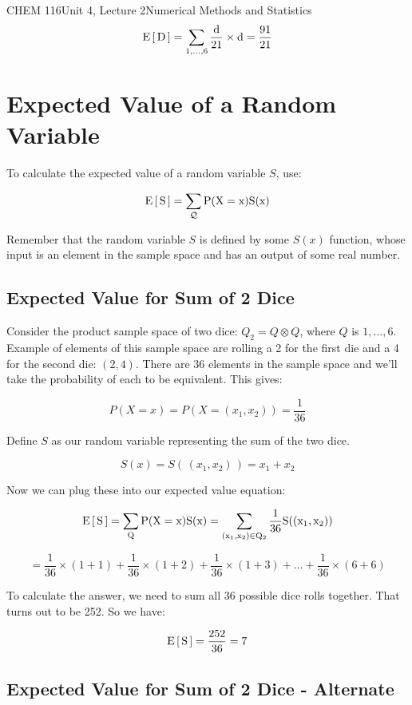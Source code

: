 \documentclass{article}
\begin{document}
\begin{tdoc}{CHEM 116}{Unit 4, Lecture 2}{Numerical Methods and Statistics}
\[
\rm{E}\left[\,D\,\right] = \sum_{1,\ldots,6} \frac{d}{21} \times d = \frac{91}{21}
\]

\section{Expected Value of a Random Variable}

To calculate the expected value of a random variable $S$, use:

\begin{equation}
\rm{E}\left[\,S\,\right] = \sum_\mathcal{Q} P(X=x)S(x)
\end{equation}

Remember that the random variable $S$ is defined by some $S(x)$
function, whose input is an element in the sample space and has an
output of some real number.


\subsection{Expected Value for Sum of 2 Dice}

Consider the product sample space of two dice: $Q_2 = Q \otimes Q$,
where $Q$ is $1,\ldots,6$. Example of elements of this sample space
are rolling a 2 for the first die and a 4 for the second die: $(2,
4)$. There are 36 elements in the sample space and we'll take the
probability of each to be equivalent. This gives:

\[
P(X = x) = P(X = (x_1, x_2)) = \frac{1}{36}
\]

Define $S$ as our random variable representing the sum of the two dice.

\[
S(x) = S(\, (x_1, x_2)\, ) = x_1 + x_2
\]

Now we can plug these into our expected value equation:

\[
\rm{E}\left[\,S\,\right] = \sum_{Q} P(X=x)S(x) = \sum_{(x_1,x_2) \in Q_2} \frac{1}{36} S( (x_1, x_2) )
\]

\[
= \frac{1}{36}\times (1 + 1) + \frac{1}{36} \times (1 + 2) + \frac{1}{36} \times (1 + 3) + \ldots + \frac{1}{36} \times (6 + 6)
\]

To calculate the answer, we need to sum all 36 possible dice rolls
together. That turns out to be 252. So we have:

\[
\rm{E}\left[\,S\,\right] = \frac{252}{36} = 7
\]

\subsection{Expected Value for Sum of 2 Dice - Alternate}


\end{tdoc}
\end{document}
